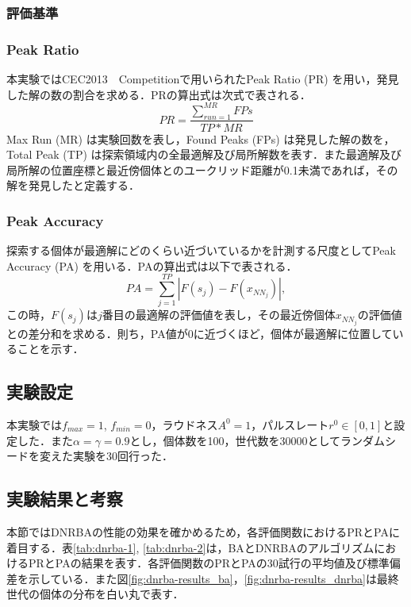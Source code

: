 \documentclass[a4j,11pt]{jarticle}
\begin{document}
\subsubsection{評価基準}
\label{sss:DNRBA-eval}

\subsubsection{Peak Ratio}
本実験ではCEC2013　Competitionで用いられたPeak Ratio (PR) \cite{CEC2013} を用い，発見した解の数の割合を求める．PRの算出式は次式で表される．
\begin{equation}
PR=\frac{\sum_{run=1}^{MR}FPs}{TP*MR}
\end{equation}
Max Run (MR) は実験回数を表し，Found Peaks (FPs) は発見した解の数を，Total Peak (TP) は探索領域内の全最適解及び局所解数を表す．また最適解及び局所解の位置座標と最近傍個体とのユークリッド距離が0.1未満であれば，その解を発見したと定義する．

\subsubsection{Peak Accuracy}
探索する個体が最適解にどのくらい近づいているかを計測する尺度としてPeak Accuracy (PA) \cite{CEC2013} を用いる．PAの算出式は以下で表される．
\begin{equation}
PA=\sum_{j=1}^{TP}|F(s_j)-F(x_{NN_j})|,
\end{equation}
この時，$F(s_j)$は$j$番目の最適解の評価値を表し，その最近傍個体$x_{NN_j}$の評価値との差分和を求める．則ち，PA値が0に近づくほど，個体が最適解に位置していることを示す．

\FloatBarrier
\subsection{実験設定}
本実験では$f_{max}=1$, $f_{min}=0$，ラウドネス$A^0=1$，パルスレート$r^0 \in [0,1]$と設定した．また$\alpha= \gamma = 0.9$とし，個体数を100，世代数を30000としてランダムシードを変えた実験を30回行った．

\subsection{実験結果と考察}
\label{sss:DNRBA-results}
本節ではDNRBAの性能の効果を確かめるため，各評価関数におけるPRとPAに着目する．表\ref{tab:dnrba-1}, \ref{tab:dnrba-2}は，BAとDNRBAのアルゴリズムにおけるPRとPAの結果を表す．各評価関数のPRとPAの30試行の平均値及び標準偏差を示している．また図\ref{fig:dnrba-results_ba}，\ref{fig:dnrba-results_dnrba}は最終世代の個体の分布を白い丸で表す．
\end{document}
